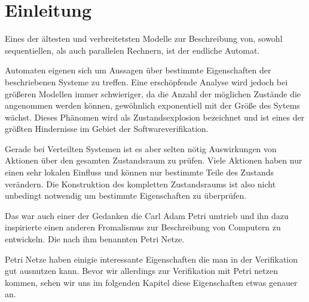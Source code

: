 \chapter{Einleitung}
\label{introduction}
Eines der ältesten und verbreitetsten Modelle zur Beschreibung von, sowohl sequentiellen, als auch parallelen Rechnern, ist der endliche Automat.

Automaten eigenen sich um Aussagen über bestimmte Eigenschaften der beschriebenen Systeme zu treffen.
Eine erschöpfende Analyse wird jedoch bei größeren Modellen immer schwieriger, da die Anzahl der möglichen Zustände die angenommen werden können, gewöhnlich exponentiell mit der Größe des Sytems wächst.
Dieses Phänomen wird als Zustandsexplosion bezeichnet und ist eines der größten Hindernisse im Gebiet der Softwareverifikation.

Gerade bei Verteilten Systemen ist es aber selten nötig Auswirkungen von Aktionen über den gesamten Zustandsraum zu prüfen.
Viele Aktionen haben nur einen sehr lokalen Einfluss und können nur bestimmte Teile des Zustands verändern.
Die Konstruktion des kompletten Zustandsraums ist also nicht unbedingt notwendig um bestimmte Eigenschaften zu überprüfen.

Das war auch einer der Gedanken die Carl Adam Petri umtrieb und ihn dazu inspirierte einen anderen Fromalismus zur Beschreibung von Computern zu entwickeln.
Die nach ihm benannten Petri Netze.

Petri Netze haben einigie interessante Eigenschaften die man in der Verifikation gut ausnutzen kann.
Bevor wir allerdings zur Verifikation mit Petri netzen kommen, sehen wir uns im folgenden Kapitel diese Eigenschaften etwas genauer an.


